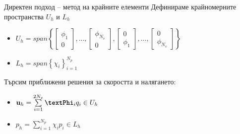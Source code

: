 \documentclass{beamer}
\begin{document}
    \begin{frame}{Директен подход -- метод на крайните елементи}
    		{Дефинираме крайномерните пространства $U_h$ и $L_h$}
		\begin{itemize}
			\item $U_h = span\left\{
								\begin{bmatrix} \phi_1 \\ 0\end{bmatrix}
								, \dots ,
								\begin{bmatrix} \phi_{N_v} \\ 0\end{bmatrix} ,
								\begin{bmatrix} 0 \\ \phi_1\end{bmatrix}
								, \dots ,
								\begin{bmatrix} 0 \\ \phi_{N_v}\end{bmatrix}
						\right\}$
  			\item $L_h = span\left\{\chi_i\right\}^{N_p}_{i = 1}$
		\end{itemize}
    		Търсим приближени решения за скоростта и налягането:
    		\begin{itemize}[<+->]
    			\item $\mathbf{u}_h = \sum\limits_{i=1}^{2N_v}{\textbf{\textPhi}_iq_i} \in U_h$
    			\item $p_h = \sum\limits_{i=1}^{N_p}{\chi_ip_i} \in L_h$
		\end{itemize}
    \end{frame}
\fi
\end{document}
